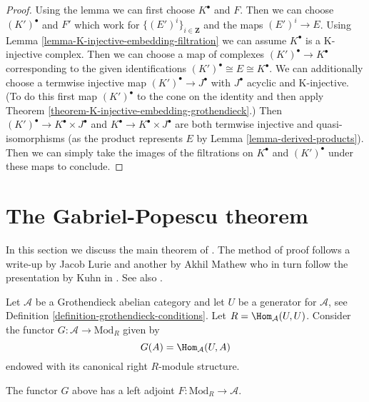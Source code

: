 \begin{proof}
Using the lemma we can first choose $K^\bullet$ and $F$.
Then we can choose $(K')^\bullet$ and $F'$ which work for
$\{(E')^i\}_{i \in \mathbf{Z}}$ and the maps $(E')^i \to E$.
Using Lemma \ref{lemma-K-injective-embedding-filtration}
we can assume $K^\bullet$ is a K-injective complex.
Then we can choose a map of complexes
$(K')^\bullet \to K^\bullet$ corresponding to
the given identifications
$(K')^\bullet \cong E \cong K^\bullet$.
We can additionally choose a termwise injective
map $(K')^\bullet \to J^\bullet$ with
$J^\bullet$ acyclic and K-injective.
(To do this first map $(K')^\bullet$ to the cone on the identity
and then apply Theorem \ref{theorem-K-injective-embedding-grothendieck}.)
Then $(K')^\bullet \to K^\bullet \times J^\bullet$ and
$K^\bullet \to K^\bullet \times J^\bullet$
are both termwise injective and quasi-isomorphisms
(as the product represents $E$ by Lemma \ref{lemma-derived-products}).
Then we can simply take the images of the filtrations
on $K^\bullet$ and $(K')^\bullet$ under these maps to conclude.
\end{proof}





\section{The Gabriel-Popescu theorem}
\label{section-gabriel-popescu}

\noindent
In this section we discuss the main theorem of \cite{GP}. The method of
proof follows a write-up by Jacob Lurie and another by Akhil Mathew
who in turn follow the presentation by Kuhn in \cite{Kuhn}.
See also \cite{Takeuchi}.

\medskip\noindent
Let $\mathcal{A}$ be a Grothendieck abelian category and let $U$ be a
generator for $\mathcal{A}$, see
Definition \ref{definition-grothendieck-conditions}.
Let $R = \Hom_\mathcal{A}(U, U)$. Consider the functor
$G : \mathcal{A} \to \text{Mod}_R$ given by
$$
G(A) = \Hom_\mathcal{A}(U, A)
$$
endowed with its canonical right $R$-module structure.

\begin{lemma}
\label{lemma-gabriel-popescu-left-adjoint}
The functor $G$ above has a left adjoint
$F : \text{Mod}_R \to \mathcal{A}$.
\end{lemma}

